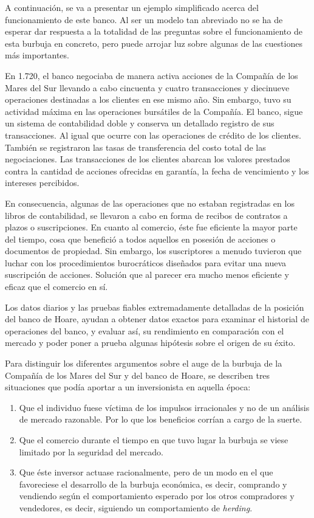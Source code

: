 A continuación, se va a presentar un ejemplo simplificado acerca del funcionamiento de este banco. Al ser un modelo tan abreviado no se ha de esperar dar respuesta a la totalidad de las preguntas sobre el funcionamiento de esta burbuja en concreto, pero puede arrojar luz sobre algunas de las cuestiones más importantes.

En 1.720, el banco negociaba de manera activa acciones de la Compañía de los Mares del Sur llevando a cabo cincuenta y cuatro transacciones y diecinueve operaciones destinadas a los clientes en ese mismo año. Sin embargo, tuvo su actividad máxima en las operaciones bursátiles de la Compañía. El banco, sigue un sistema de contabilidad doble y conserva un detallado registro de sus transacciones. Al igual que ocurre con las operaciones de crédito de los clientes. También se registraron las tasas de transferencia del costo total de las negociaciones. Las transacciones de los clientes abarcan los valores prestados contra la cantidad de acciones ofrecidas en garantía, la fecha de vencimiento y los intereses percibidos. 

En consecuencia, algunas de las operaciones que no estaban registradas en los libros de contabilidad, se llevaron a cabo en forma de recibos de contratos a plazos o suscripciones. En cuanto al comercio, éste fue eficiente la mayor parte del tiempo, cosa que benefició a todos aquellos en posesión de acciones o documentos de propiedad. Sin embargo, los suscriptores a menudo tuvieron que luchar con los procedimientos burocráticos diseñados para evitar una nueva suscripción de acciones. Solución que al parecer era mucho menos eficiente y eficaz que el comercio en sí. 

Los datos diarios y las pruebas fiables extremadamente detalladas de la posición del banco de Hoare, ayudan a obtener datos exactos para examinar el historial de operaciones del banco, y evaluar así, su rendimiento en comparación con el mercado y poder poner a prueba algunas hipótesis sobre el origen de su éxito. 

Para distinguir los diferentes argumentos sobre el auge de la burbuja de la Compañía de los Mares del Sur y del banco de Hoare, se describen tres situaciones que podía aportar a un inversionista en aquella época:

 \begin{enumerate}
\item Que el individuo fuese víctima de los impulsos irracionales y no de un análisis de mercado razonable. Por lo que los beneficios corrían a cargo de la suerte.
\item Que el comercio durante el tiempo en que tuvo lugar la burbuja se viese limitado por la seguridad del mercado. 
\item Que éste inversor actuase racionalmente, pero de un modo en el que favoreciese el desarrollo de la burbuja económica, es decir, comprando y vendiendo según el comportamiento esperado por los otros compradores y vendedores, es decir, siguiendo un comportamiento de \emph{herding}.
 \end{enumerate}

